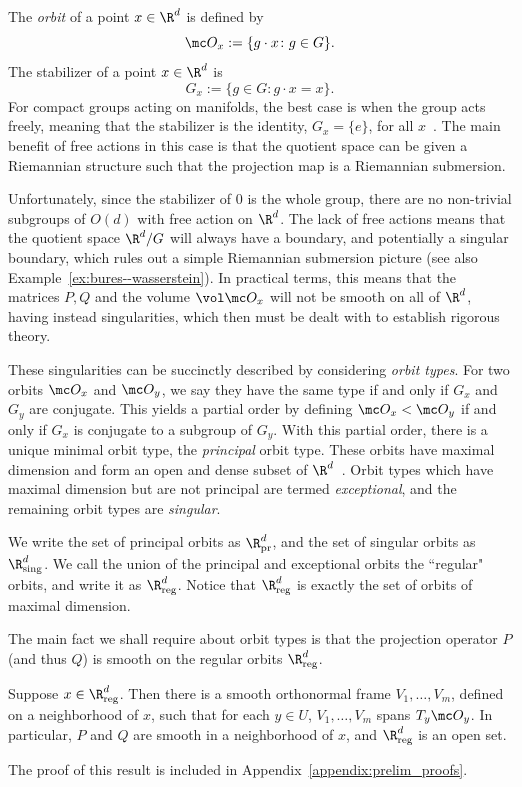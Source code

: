 \documentclass[twoside,a4paper,11pt]{article}
\newcommand{\pr}{\mathrm{pr}}
\newcommand{\reg}{\mathrm{reg}}
\newcommand{\sing}{\mathrm{sing}}
\theoremstyle{plain}
\begin{document}
The {\it orbit} of a point $x \in \R^d$ is defined
by
$$
\mc O_x := \{g\cdot x \colon g \in G\}.
$$
The stabilizer of a point $x \in \R^d$
is
$$
G_x :=\{ g \in G \colon g\cdot x = x\}.
$$
For compact groups acting
on manifolds, the best case
is when the group acts freely, meaning that 
the stabilizer is the identity, $G_x = \{e\}$,
for all $x$~\cite[Theorem 21.10]{lee2018introduction}.
The main benefit of free actions
in this case
is that the quotient space can be given a Riemannian
structure such that the projection map is a Riemannian
submersion.

Unfortunately, since the stabilizer of $0$ is
the whole group, there
are no non-trivial subgroups of $O(d)$ with free action on $\R^d$.
The lack of free actions means
that the quotient space $\R^d/G$ will always have a boundary,
and potentially a singular boundary,
which rules out a simple Riemannian submersion picture (see also Example~\ref{ex:bures--wasserstein}).
In practical terms, this means that the
matrices $P, Q$ and the volume $\vol \mc O_x$
will not be smooth on all of $\R^d$, having instead
singularities, which then must be dealt with to establish
rigorous theory.



These singularities
can be succinctly described
by considering {\it orbit types}.
For two orbits $\mc O_x$ and $\mc O_y$,
we say they have the same type if and only if 
$G_x$ and $G_y$ are conjugate.
This yields a partial order
by defining $\mc O_x < \mc O_y$
if and only if $G_x$ is conjugate to a subgroup
of $G_y$.
With this partial order, there is a unique
minimal orbit type, the {\it principal}
orbit type. These orbits have maximal dimension
and form an open and dense subset of $\R^d$~\cite[Proposition 2.2.4]{berndt2016submanifolds}.
Orbit types which have maximal dimension but are not
principal are termed {\it exceptional},
and the remaining orbit types are {\it singular}.

We write the set of principal orbits as $\R^d_{\pr}$,
and the set of singular orbits as $\R^d_{\sing}$.
We call the union of the principal and exceptional orbits
the ``regular" orbits, and write it as $\R^d_{\reg}$.
Notice that $\R^d_{\reg}$
is exactly the set of orbits of maximal dimension.


The main fact we shall require about orbit types
is that the projection operator $P$ 
(and thus $Q$) is smooth on the regular orbits $\R^d_{\reg}$.
\begin{prop}
\label{prop:smoothness_of_P}
Suppose $x \in \R^d_{\reg}$.
Then there is a smooth orthonormal frame $V_1, \ldots, V_m$,
defined on a neighborhood of $x$, such that for 
each $y \in U$, $V_1, \ldots, V_m$ spans $T_y\mc O_y$.
In particular, $P$ and $Q$ are smooth in a neighborhood of
$x$, and $\R^d_{\reg}$ is an open set.
\end{prop}
The proof of this result is included in Appendix~\ref{appendix:prelim_proofs}.
\end{document}

